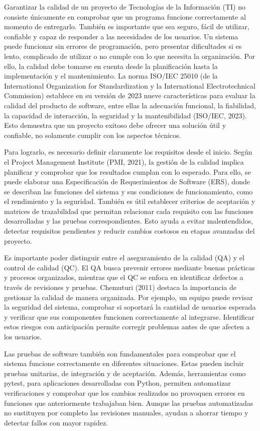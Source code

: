 \documentclass[12pt,letterpaper]{article}
\begin{document}
Garantizar la calidad de un proyecto de Tecnologías de la Información (TI) no consiste únicamente en comprobar que un programa funcione correctamente al momento de entregarlo. También es importante que sea seguro, fácil de utilizar, confiable y capaz de responder a las necesidades de los usuarios. Un sistema puede funcionar sin errores de programación, pero presentar dificultades si es lento, complicado de utilizar o no cumple con lo que necesita la organización. Por ello, la calidad debe tomarse en cuenta desde la planificación hasta la implementación y el mantenimiento.  La norma ISO/IEC 25010 (de la International Organization for Standardization y la International Electrotechnical Commission) establece en su versión de 2023 nueve características para evaluar la calidad del producto de software, entre ellas la adecuación funcional, la fiabilidad, la capacidad de interacción, la seguridad y la mantenibilidad (ISO/IEC, 2023). Esto demuestra que un proyecto exitoso debe ofrecer una solución útil y confiable, no solamente cumplir con los aspectos técnicos.

Para lograrlo, es necesario definir claramente los requisitos desde el inicio. Según el Project Management Institute (PMI, 2021), la gestión de la calidad implica planificar y comprobar que los resultados cumplan con lo esperado. Para ello, se puede elaborar una Especificación de Requerimientos de Software (ERS), donde se describan las funciones del sistema y sus condiciones de funcionamiento, como el rendimiento y la seguridad. También es útil establecer criterios de aceptación y matrices de trazabilidad que permitan relacionar cada requisito con las funciones desarrolladas y las pruebas correspondientes. Esto ayuda a evitar malentendidos, detectar requisitos pendientes y reducir cambios costosos en etapas avanzadas del proyecto.

Es importante poder distinguir entre el aseguramiento de la calidad (QA) y el control de calidad (QC). El QA busca prevenir errores mediante buenas prácticas y procesos organizados, mientras que el QC se enfoca en identificar defectos a través de revisiones y pruebas. Chemuturi (2011) destaca la importancia de gestionar la calidad de manera organizada. Por ejemplo, un equipo puede revisar la seguridad del sistema, comprobar si soportará la cantidad de usuarios esperada y verificar que sus componentes funcionen correctamente al integrarse. Identificar estos riesgos con anticipación permite corregir problemas antes de que afecten a los usuarios.

Las pruebas de software también son fundamentales para comprobar que el sistema funcione correctamente en diferentes situaciones. Estas pueden incluir pruebas unitarias, de integración y de aceptación. Además, herramientas como pytest, para aplicaciones desarrolladas con Python, permiten automatizar verificaciones y comprobar que los cambios realizados no provoquen errores en funciones que anteriormente trabajaban bien. Aunque las pruebas automatizadas no sustituyen por completo las revisiones manuales, ayudan a ahorrar tiempo y detectar fallos con mayor rapidez.
\end{document}
